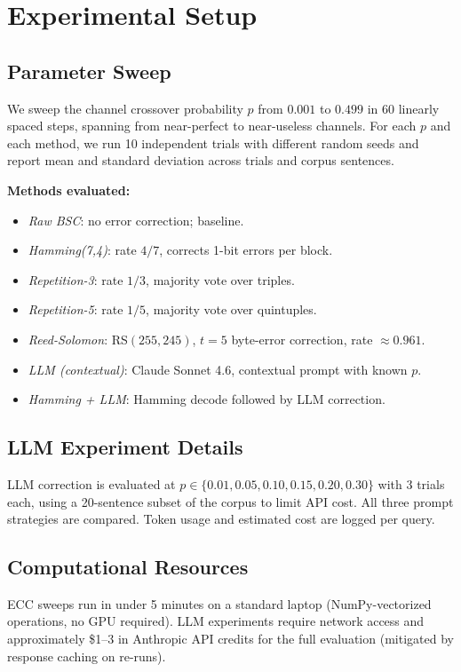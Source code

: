 \section{Experimental Setup}
\label{sec:experiments}

\subsection{Parameter Sweep}

We sweep the channel crossover probability $p$ from $0.001$ to $0.499$ in 60
linearly spaced steps, spanning from near-perfect to near-useless channels.
For each $p$ and each method, we run 10 independent trials with different random
seeds and report mean and standard deviation across trials and corpus sentences.

\textbf{Methods evaluated:}
\begin{itemize}
  \item \emph{Raw BSC}: no error correction; baseline.
  \item \emph{Hamming(7,4)}: rate $4/7$, corrects 1-bit errors per block.
  \item \emph{Repetition-3}: rate $1/3$, majority vote over triples.
  \item \emph{Repetition-5}: rate $1/5$, majority vote over quintuples.
  \item \emph{Reed-Solomon}: RS$(255,245)$, $t=5$ byte-error correction, rate $\approx 0.961$.
  \item \emph{LLM (contextual)}: Claude Sonnet 4.6, contextual prompt with known $p$.
  \item \emph{Hamming + LLM}: Hamming decode followed by LLM correction.
\end{itemize}

\subsection{LLM Experiment Details}

LLM correction is evaluated at $p \in \{0.01, 0.05, 0.10, 0.15, 0.20, 0.30\}$
with 3 trials each, using a 20-sentence subset of the corpus to limit API cost.
All three prompt strategies are compared.  Token usage and estimated cost are
logged per query.

\subsection{Computational Resources}

ECC sweeps run in under 5 minutes on a standard laptop (NumPy-vectorized
operations, no GPU required).  LLM experiments require network access and
approximately \$1--3 in Anthropic API credits for the full evaluation (mitigated
by response caching on re-runs).
